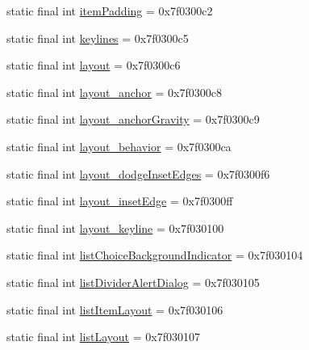 \begin{DoxyCompactItemize}
\item 
static final int \mbox{\hyperlink{classandroid_1_1support_1_1v7_1_1appcompat_1_1_r_1_1attr_a39f698094b1d9f497799e81850def158}{item\+Padding}} = 0x7f0300c2
\item 
static final int \mbox{\hyperlink{classandroid_1_1support_1_1v7_1_1appcompat_1_1_r_1_1attr_aece915033616c0e1e2a804ed0126e14f}{keylines}} = 0x7f0300c5
\item 
static final int \mbox{\hyperlink{classandroid_1_1support_1_1v7_1_1appcompat_1_1_r_1_1attr_a4fe736a4576409d2d17038ba5dc0f33b}{layout}} = 0x7f0300c6
\item 
static final int \mbox{\hyperlink{classandroid_1_1support_1_1v7_1_1appcompat_1_1_r_1_1attr_a2b5a0efc752a48bdb0ca00817c6e9f23}{layout\+\_\+anchor}} = 0x7f0300c8
\item 
static final int \mbox{\hyperlink{classandroid_1_1support_1_1v7_1_1appcompat_1_1_r_1_1attr_a4d7d3fbd05a6be217777645281cdc9cc}{layout\+\_\+anchor\+Gravity}} = 0x7f0300c9
\item 
static final int \mbox{\hyperlink{classandroid_1_1support_1_1v7_1_1appcompat_1_1_r_1_1attr_a3736de87f761e36b36efa9b036cd6da7}{layout\+\_\+behavior}} = 0x7f0300ca
\item 
static final int \mbox{\hyperlink{classandroid_1_1support_1_1v7_1_1appcompat_1_1_r_1_1attr_a1f612244428a1d99c1d75a8628de730a}{layout\+\_\+dodge\+Inset\+Edges}} = 0x7f0300f6
\item 
static final int \mbox{\hyperlink{classandroid_1_1support_1_1v7_1_1appcompat_1_1_r_1_1attr_acb0da90702c2a0f8be38d7950eb6500d}{layout\+\_\+inset\+Edge}} = 0x7f0300ff
\item 
static final int \mbox{\hyperlink{classandroid_1_1support_1_1v7_1_1appcompat_1_1_r_1_1attr_a147bce05335e8669508656253ed0103b}{layout\+\_\+keyline}} = 0x7f030100
\item 
static final int \mbox{\hyperlink{classandroid_1_1support_1_1v7_1_1appcompat_1_1_r_1_1attr_a6bc5f753853d9121d0ea7f85b6687258}{list\+Choice\+Background\+Indicator}} = 0x7f030104
\item 
static final int \mbox{\hyperlink{classandroid_1_1support_1_1v7_1_1appcompat_1_1_r_1_1attr_ac91bf37c926c3ae613ac7aa6a154ec8f}{list\+Divider\+Alert\+Dialog}} = 0x7f030105
\item 
static final int \mbox{\hyperlink{classandroid_1_1support_1_1v7_1_1appcompat_1_1_r_1_1attr_a5f32cb9405a590842e40ec2f6fa378fb}{list\+Item\+Layout}} = 0x7f030106
\item 
static final int \mbox{\hyperlink{classandroid_1_1support_1_1v7_1_1appcompat_1_1_r_1_1attr_a8e2142f72964f234bab10106c406d308}{list\+Layout}} = 0x7f030107

\end{DoxyCompactItemize}
